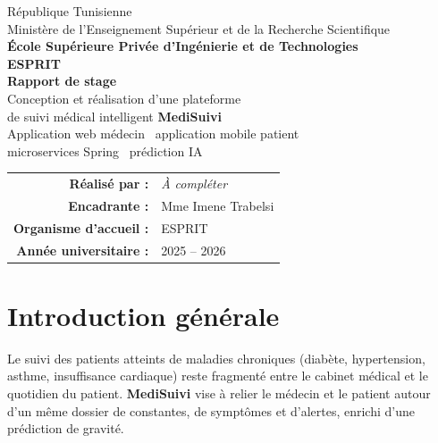 \documentclass[12pt,a4paper,oneside]{report}
\begin{document}
\begin{titlepage}
\centering
\vspace*{1.2cm}
{\Large République Tunisienne}\\[0.3em]
{\large Ministère de l'Enseignement Supérieur et de la Recherche Scientifique}\\[1.4cm]
{\Large \textbf{École Supérieure Privée d'Ingénierie et de Technologies}}\\
{\Large \textbf{ESPRIT}}\\[1.6cm]
{\huge\bfseries Rapport de stage}\\[0.6cm]
{\LARGE Conception et réalisation d'une plateforme}\\[0.2cm]
{\LARGE de suivi médical intelligent \textbf{MediSuivi}}\\[1.4cm]
{\large Application web médecin \textbullet\ application mobile patient}\\[0.15cm]
{\large microservices Spring \textbullet\ prédiction IA}\\[2cm]
\begin{tabular}{rl}
\textbf{Réalisé par :} & \textit{À compléter} \\[0.4em]
\textbf{Encadrante :} & Mme Imene Trabelsi \\[0.4em]
\textbf{Organisme d'accueil :} & ESPRIT \\[0.4em]
\textbf{Année universitaire :} & 2025 -- 2026 \\
\end{tabular}
\vfill
\end{titlepage}

\onehalfspacing
{}

\tableofcontents
\clearpage
\listoffigures
\clearpage
\listoftables
\clearpage


\chapter*{Introduction générale}

Le suivi des patients atteints de maladies chroniques (diabète, hypertension, asthme, insuffisance cardiaque) reste fragmenté entre le cabinet médical et le quotidien du patient. \textbf{MediSuivi} vise à relier le médecin et le patient autour d'un même dossier de constantes, de symptômes et d'alertes, enrichi d'une prédiction de gravité.
\end{document}
